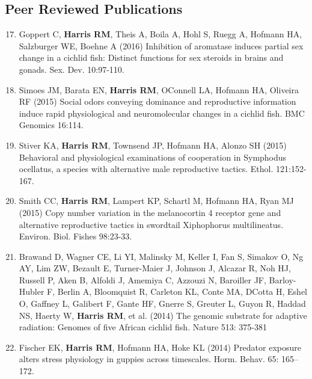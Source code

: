 \documentclass[margin,line]{resume}
\newenvironment{benumerate}[1]{
    \let\oldItem\item
    \def\item{\addtocounter{enumi}{-2}\oldItem}
    \begin{enumerate}
    \setcounter{enumi}{#1}
    \addtocounter{enumi}{1}
}{
    \end{enumerate}
}
\begin{document}
\begin{resume}
    \section{\mysidestyle Peer Reviewed Publications}
    
\begin{benumerate}{16}
\setlength{\itemsep}{3pt}

\item Goppert C, {\bf Harris RM}, Theis A, Boila A, Hohl S, Ruegg A, Hofmann HA, Salzburger WE, Boehne A (2016)  Inhibition of aromatase induces partial sex change in a cichlid fish: Distinct functions for sex steroids in brains and gonads. Sex. Dev. 10:97-110.

\item Simoes JM, Barata EN, {\bf Harris RM}, O\textsc{}Connell LA, Hofmann HA, Oliveira RF (2015) Social odors conveying dominance and reproductive information induce rapid physiological and neuromolecular changes in a cichlid fish. BMC Genomics 16:114. 

\item Stiver KA, {\bf Harris RM}, Townsend JP, Hofmann HA, Alonzo SH (2015) Behavioral and physiological examinations of cooperation in Symphodus ocellatus, a species with alternative male reproductive tactics. Ethol. 121:152-167.

\item Smith CC, {\bf Harris RM}, Lampert KP, Schartl M, Hofmann HA, Ryan MJ (2015) Copy number variation in the melanocortin 4 receptor gene and alternative reproductive tactics in swordtail Xiphophorus multilineatus. Environ. Biol. Fishes 98:23-33.

\item Brawand D, Wagner CE, Li YI, Malinsky M, Keller I, Fan S, Simakov O, Ng AY, Lim ZW, Bezault E, Turner-Maier J, Johnson J, Alcazar R, Noh HJ, Russell P, Aken B, Alfoldi J, Amemiya C, Azzouzi N, Baroiller JF, Barloy-Hubler F, Berlin A, Bloomquist R, Carleton KL, Conte MA, D\textsc{}Cotta H, Eshel O, Gaffney L, Galibert F, Gante HF, Gnerre S, Greuter L, Guyon R, Haddad NS, Haerty W, {\bf Harris RM}, et al. (2014) The genomic substrate for adaptive radiation: Genomes of five African cichlid fish. Nature 513: 375-381

\item Fischer EK, {\bf Harris RM}, Hofmann HA, Hoke KL (2014) Predator exposure alters stress physiology in guppies across timescales. Horm. Behav. 65: 165–172. 


\end{benumerate}
\end{resume}
\end{document}
